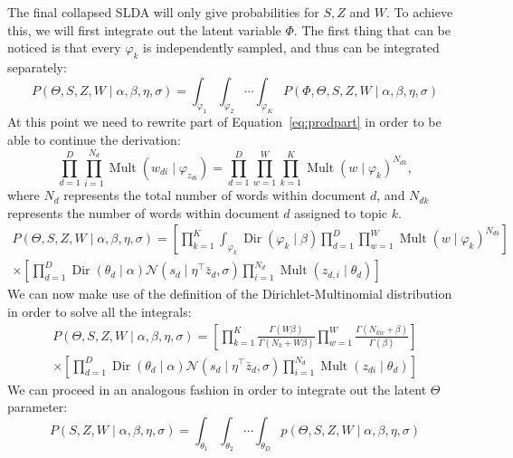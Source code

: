 \documentclass{article} %
\DeclareMathOperator{\Dir}{Dir}
\DeclareMathOperator{\Mult}{Mult}
\renewcommand{\phi}{\varphi}
\begin{document}
The final collapsed SLDA will only give probabilities for \(S, Z\) and \(W\). 
To achieve this, we will first integrate out the latent variable $\Phi$. The first thing that can be noticed is that every $\varphi_k$ is independently sampled, and thus can be integrated separately:
\begin{equation}
P(\Theta, S, Z, W \mid \alpha, \beta, \eta, \sigma) = \int_{\phi_1}\int_{\phi_2}\cdots \int_{\phi_K} P(\Phi, \Theta, S, Z, W \mid \alpha, \beta, \eta, \sigma)
\end{equation}
At this point we need to rewrite part of Equation~\ref{eq:prodpart} in order to be able to continue the derivation:
\begin{equation}
\prod_{d = 1}^D \prod_{i = 1}^{N_d} \Mult(w_{di} \mid \phi_{z_{di}}) = \prod_{d = 1}^D \prod_{w = 1}^W \prod_{k = 1}^K \Mult(w \mid \phi_k)^{N_{dk}},
\end{equation}
where $N_d$ represents the total number of words within document $d$, and $N_{dk}$ represents the number of words within document $d$ assigned to topic $k$.
\begin{equation}
\begin{gathered}
P(\Theta, S, Z, W \mid \alpha, \beta, \eta, \sigma) = \left[ \prod_{k = 1}^K \int_{\phi_k} \Dir(\phi_k \mid \beta) \prod_{d = 1}^D \prod_{w = 1}^W \Mult(w \mid \phi_k)^{N_{dk}} \right]  \\
\times\left[ \prod_{d = 1}^D \Dir(\theta_d \mid \alpha) \mathcal{N}(s_d \mid \eta^\top \bar{z}_d, \sigma) \prod_{i = 1}^{N_d} \Mult(z_{d, i} \mid \theta_d) \right]
\end{gathered}
\end{equation}
We can now make use of the definition of the Dirichlet-Multinomial distribution in order to solve all the integrals:
\begin{equation}
\begin{gathered}
P(\Theta, S, Z, W \mid \alpha, \beta, \eta, \sigma) = \left[ \prod_{k = 1}^K \frac{ \Gamma(W\beta)}{\Gamma(N_k + W\beta)} \prod_{w = 1}^W \frac{\Gamma(N_{kw}+\beta)}{\Gamma(\beta)}\right]\\
\times\left[ \prod_{d = 1}^D \Dir(\theta_d \mid \alpha) \mathcal{N}(s_d \mid \eta^\top \bar{z}_d, \sigma) \prod_{i = 1}^{N_d} \Mult(z_{di} \mid \theta_d) \right]
\end{gathered}
\end{equation}
We can proceed in an analogous fashion in order to integrate out the latent $\Theta$ parameter:
\begin{equation}
P(S, Z, W \mid \alpha, \beta, \eta, \sigma) = \int_{\theta_1}\int_{\theta_2}\cdots \int_{\theta_D} p(\Theta, S, Z, W \mid \alpha, \beta, \eta, \sigma)
\end{equation}
\end{document}
